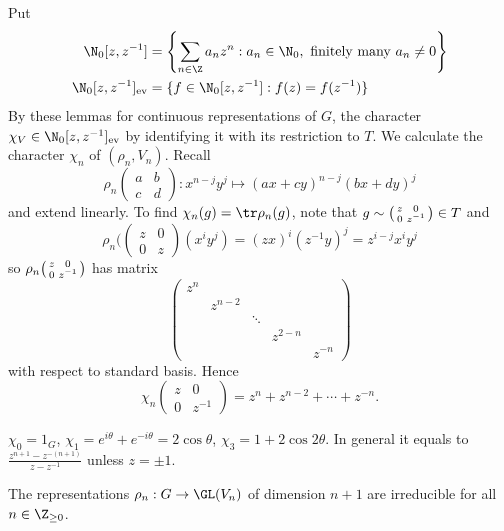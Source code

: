 \documentclass[a4paper]{article}
\theoremstyle{definition}
\begin{document}
Put
\begin{align*}
  \N_0[z, z^{-1}] &= \left\{ \sum_{n \in \Z} a_n z^n: a_n \in \N_0, \text{ finitely many } a_n \neq 0 \right\} \\
  \N_0[z, z^{-1}]_{\text{ev}} &= \{f \in \N_0[z, z^{-1}]: f(z) = f(z^{-1})\}
\end{align*}
By these lemmas for continuous representations of \(G\), the character \(\chi_V \in \N_0[z, z^{-1}]_{\text{ev}}\) by identifying it with its restriction to \(T\). We calculate the character \(\chi_n\) of \((\rho_n, V_n)\). Recall
\[
  \rho_n
  \begin{pmatrix}
    a & b \\
    c & d
  \end{pmatrix}
  : x^{n - j} y^j \mapsto (ax + cy)^{n - j} (bx + dy)^j
\]
and extend linearly. To find \(\chi_n(g) = \tr \rho_n(g)\), note that \(g \sim
\begin{psmallmatrix}
  z & 0 \\
  0 & z^{-1}
\end{psmallmatrix}
\in T\) and
\[
  \rho_n(
  \begin{pmatrix}
    z & 0 \\
    0 & z
  \end{pmatrix}
  (x^i y^j) = (zx)^i (z^{-1} y)^j = z^{i - j} x^i y^j
\]
so \(\rho_n
\begin{psmallmatrix}
  z & 0 \\
  0 & z^{-1}
\end{psmallmatrix}
\) has matrix
\[
  \begin{pmatrix}
    z^n \\
    & z^{n - 2} \\
    & & \ddots \\
    & & & z^{2 - n} \\
    & & & & z^{-n}
  \end{pmatrix}
\]
with respect to standard basis. Hence
\[
  \chi_n
  \begin{pmatrix}
    z & 0 \\
    0 & z^{-1}
  \end{pmatrix}
  = z^n + z^{n - 2} + \cdots + z^{-n}.
\]

\begin{ex}
  \(\chi_0 = 1_G\), \(\chi_1 = e^{i\theta} + e^{-i\theta} = 2 \cos \theta\), \(\chi_3 = 1 + 2 \cos 2\theta\). In general it equals to \(\frac{z^{n + 1} - z^{-(n + 1)}}{z - z^{-1}}\) unless \(z = \pm 1\).
\end{ex}

\begin{theorem}
  The representations \(\rho_n: G \to \GL(V_n)\) of dimension \(n + 1\) are irreducible for all \(n \in \Z_{\geq 0}\).
\end{theorem}
\end{document}
